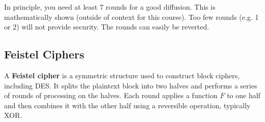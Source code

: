 In principle, you need at least 7 rounds for a good diffusion. This is mathematically shown (outside of context for this course). Too few rounds (e.g. 1 or 2) will not provide security. The rounds can easily be reverted. 

\subsection{Feistel Ciphers}
\begin{defn}
A \textbf{Feistel cipher} is a symmetric structure used to construct block ciphers, including DES. It splits the plaintext block into two halves and performs a series of rounds of processing on the halves. Each round applies a function $F$ to one half and then combines it with the other half using a reversible operation, typically XOR.
\end{defn}

